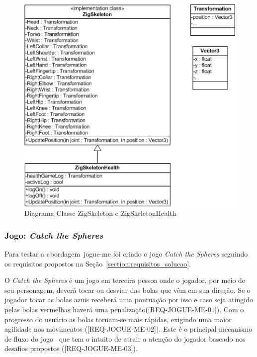 \begin{figure}[!htbp]
 \centering
 \includegraphics[scale=0.8]{./img/diagclasszigfu.png}
 \caption{Diagrama Classe ZigSkeleton e ZigSkeletonHealth}
 \label{fig:diagramaclassezigfu}
\end{figure}
%

\subsubsection{Jogo: \textit{Catch the Spheres}}\label{jogo_catch}
Para testar a abordagem~\ac{jogue-me} foi criado o jogo \textit{Catch the Spheres} seguindo os requisitos propostos na Seção~\ref{section:requisitos_solucao}.  

O \textit{Catch the Spheres} é um jogo em terceira pessoa onde o jogador, por meio de seu personagem, deverá tocar ou desviar das bolas que vêm em sua direção. Se o jogador tocar as bolas azuis receberá uma pontuação por isso e caso seja atingido pelas bolas vermelhas haverá uma penalização([REQ-JOGUE-ME-01]). Com o progresso do usuário as bolas tornam-se mais rápidas, exigindo uma maior agilidade nos movimentos ([REQ-JOGUE-ME-02]). Este é o principal mecanismo de fluxo do jogo~\cite{sweetser2005-gameflow} que tem o intuito de atrair a atenção do jogador baseado nos desafios propostos ([REQ-JOGUE-ME-03]). 

